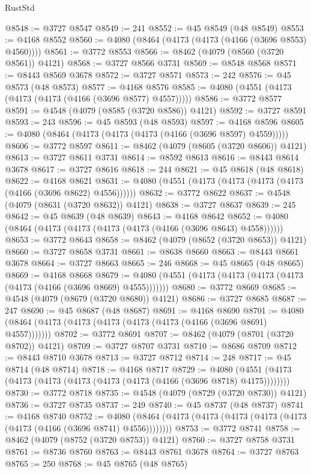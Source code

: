 \begin{lexlean}{RustStd}
\begin{coremodule}
@8548 := @3727 @8547
@8549 := 241
@8552 := @45 @8549 (@48 @8549)
@8553 := @4168 @8552
@8560 := @4080 (@8464 (@4173 (@4173 (@4166 (@3696 @8553) @4560))))
@8561 := @3772 @8553
@8566 := @8462 (@4079 (@8560 (@3720 @8561)) @4121)
@8568 := @3727 @8566 @3731
@8569 := @8548 @8568
@8571 := @8443 @8569 @3678
@8572 := @3727 @8571
@8573 := 242
@8576 := @45 @8573 (@48 @8573)
@8577 := @4168 @8576
@8585 := @4080 (@4551 (@4173 (@4173 (@4173 (@4166 (@3696 @8577) @4557)))))
@8586 := @3772 @8577
@8591 := @4548 (@4079 (@8585 (@3720 @8586)) @4121)
@8592 := @3727 @8591
@8593 := 243
@8596 := @45 @8593 (@48 @8593)
@8597 := @4168 @8596
@8605 := @4080 (@8464 (@4173 (@4173 (@4173 (@4166 (@3696 @8597) @4559)))))
@8606 := @3772 @8597
@8611 := @8462 (@4079 (@8605 (@3720 @8606)) @4121)
@8613 := @3727 @8611 @3731
@8614 := @8592 @8613
@8616 := @8443 @8614 @3678
@8617 := @3727 @8616
@8618 := 244
@8621 := @45 @8618 (@48 @8618)
@8622 := @4168 @8621
@8631 := @4080 (@4551 (@4173 (@4173 (@4173 (@4173 (@4166 (@3696 @8622) @4556))))))
@8632 := @3772 @8622
@8637 := @4548 (@4079 (@8631 (@3720 @8632)) @4121)
@8638 := @3727 @8637
@8639 := 245
@8642 := @45 @8639 (@48 @8639)
@8643 := @4168 @8642
@8652 := @4080 (@8464 (@4173 (@4173 (@4173 (@4173 (@4166 (@3696 @8643) @4558))))))
@8653 := @3772 @8643
@8658 := @8462 (@4079 (@8652 (@3720 @8653)) @4121)
@8660 := @3727 @8658 @3731
@8661 := @8638 @8660
@8663 := @8443 @8661 @3678
@8664 := @3727 @8663
@8665 := 246
@8668 := @45 @8665 (@48 @8665)
@8669 := @4168 @8668
@8679 := @4080 (@4551 (@4173 (@4173 (@4173 (@4173 (@4173 (@4166 (@3696 @8669) @4555)))))))
@8680 := @3772 @8669
@8685 := @4548 (@4079 (@8679 (@3720 @8680)) @4121)
@8686 := @3727 @8685
@8687 := 247
@8690 := @45 @8687 (@48 @8687)
@8691 := @4168 @8690
@8701 := @4080 (@8464 (@4173 (@4173 (@4173 (@4173 (@4173 (@4166 (@3696 @8691) @4557)))))))
@8702 := @3772 @8691
@8707 := @8462 (@4079 (@8701 (@3720 @8702)) @4121)
@8709 := @3727 @8707 @3731
@8710 := @8686 @8709
@8712 := @8443 @8710 @3678
@8713 := @3727 @8712
@8714 := 248
@8717 := @45 @8714 (@48 @8714)
@8718 := @4168 @8717
@8729 := @4080 (@4551 (@4173 (@4173 (@4173 (@4173 (@4173 (@4173 (@4166 (@3696 @8718) @4175))))))))
@8730 := @3772 @8718
@8735 := @4548 (@4079 (@8729 (@3720 @8730)) @4121)
@8736 := @3727 @8735
@8737 := 249
@8740 := @45 @8737 (@48 @8737)
@8741 := @4168 @8740
@8752 := @4080 (@8464 (@4173 (@4173 (@4173 (@4173 (@4173 (@4173 (@4166 (@3696 @8741) @4556))))))))
@8753 := @3772 @8741
@8758 := @8462 (@4079 (@8752 (@3720 @8753)) @4121)
@8760 := @3727 @8758 @3731
@8761 := @8736 @8760
@8763 := @8443 @8761 @3678
@8764 := @3727 @8763
@8765 := 250
@8768 := @45 @8765 (@48 @8765)

\end{coremodule}
\end{lexlean}
